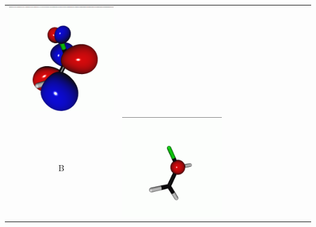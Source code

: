 \documentclass[journal=jctcce,manuscript=article]{achemso}
\begin{document}
\begin{table}[H]
\begin{tabular}{c|ccc|cccc|cccc}
\begin{minipage}{0.2\textwidth}
         \includegraphics[scale=0.10]{NTO/CH2CHF/1p.png}
     \end{minipage}
     \\
         B &  
     \begin{minipage}{0.2\textwidth}
         \centering
         \includegraphics[scale=0.10]{NTO/CH2CHF/2h.png}

\end{minipage}
\end{tabular}
\end{table}
\end{document}
